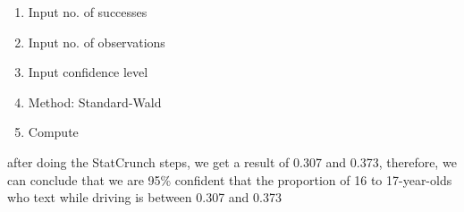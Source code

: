 \documentclass{report}
\begin{document}
\begin{mdframed}
\begin{enumerate}
            \item Input no. of successes
            \item Input no. of observations
            \item Input confidence level
            \item Method: Standard-Wald
            \item Compute
        \end{enumerate}
        \bigbreak \noindent 
        after doing the StatCrunch steps, we get a result of 0.307 and 0.373, therefore, we can conclude that we are 95\% confident that the proportion of 16 to 17-year-olds who text while driving is between 0.307 and 0.373

      \end{mdframed}

      \pagebreak \bigbreak \noindent 
\end{document}
